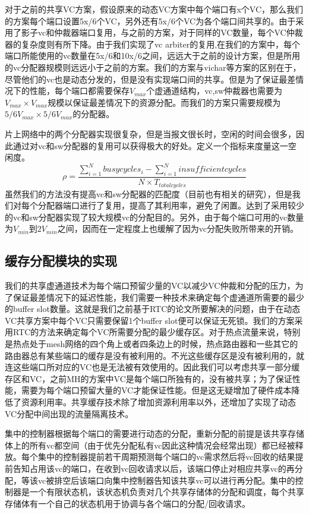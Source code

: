 ﻿\documentclass[10pt,journal]{IEEEtran}
\begin{document}
对于之前的共享VC方案，假设原来的动态VC方案中每个端口有x个VC，那么我们的方案每个端口设置5x/6个VC，另外还有5x/6个VC为各个端口间共享的。由于采用了影子vc和仲裁器端口复用，与之前的方案，对于同样的VC数量，每个VC仲裁器的复杂度则有所下降。由于我们实现了vc arbiter的复用,在我们的方案中，每个端口所能使用的vc数量在5x/6和10x/6之间，远远大于之前的设计方案，但是所用的vc分配器规模则远远小于之前的方案。我们的方案与vichar等方案的区别在于，尽管他们的vc也是动态分发的，但是没有实现端口间的共享。但是为了保证最差情况下的性能，每个端口都需要保存$V_{max}$个虚通道结构，vc,sw仲裁器也需要为$V_{max} \times V_{max}$规模以保证最差情况下的资源分配。而我们的方案只需要规模为$5/6V_{max}\times 5/6V_{max}$的分配器。

片上网络中的两个分配器实现很复杂，但是当报文很长时，空闲的时间会很多，因此通过对vc和sw分配器的复用可以获得极大的好处。定义一个指标来度量这一空闲度。$$\rho=\frac{\sum_{i=1}^N busycycles_i-\sum_{i=1}^Ninsufficientcycles}{N\times T_{totalcycles}}$$虽然我们的方法没有提高vc和sw分配器的匹配度（目前也有相关的研究），但是我们对每个分配器端口进行了复用，提高了其利用率，避免了闲置。达到了采用较少的vc和sw分配器实现了较大规模vc的分配目的。另外，由于每个端口可用的vc数量为$V_{min}$到$2V_{min}$之间，因而在一定程度上也缓解了因为vc分配失败所带来的开销。

\subsection{缓存分配模块的实现}
我们的共享虚通道技术为每个端口预留少量的VC以减少VC仲裁和分配的压力，为了保证最差情况下的延迟性能，我们需要一种技术来确定每个虚通道所需要的最少的buffer slot数量。这就是我们之前基于RTC的论文所要解决的问题，由于在动态VC共享方案中每个VC只需要保留1个buffer slot便可以保证无死锁。我们的方案采用RTC的方法来确定每个VC所需要分配的最少缓存区。对于热点流量来说，特别是热点处于mesh网络的四个角上或者四条边上的时候，热点路由器和一些其它的路由器总有某些端口的缓存是没有被利用的。不光这些缓存区是没有被利用的，就连这些端口所对应的VC也是无法被有效使用的。因此我们可以考虑共享一部分缓存区和VC，之前MH的方案中VC是每个端口所独有的，没有被共享；为了保证性能，需要为每个端口预留大量的VC才能保证性能。但是这无疑增加了硬件成本降低了资源利用率。共享缓存技术除了增加资源利用率以外，还增加了实现了动态VC分配中间出现的流量隔离技术。

集中的控制器根据每个端口的需要进行动态的分配，重新分配的前提是该共享存储体上的所有vc都空间（由于优先分配私有vc因此这种情况会经常出现）都已经被释放。每个集中的控制器提前若干周期预测每个端口的vc需求然后将vc回收的结果提前告知占用该vc的端口，在收到vc回收请求以后，该端口停止对相应共享vc的再分配，等该vc被排空后该端口向集中控制器告知该共享vc可以进行再分配。集中的控制器是一个有限状态机，该状态机负责对几个共享存储体的分配和调度，每个共享存储体有一个自己的状态机用于协调与各个端口的分配/回收请求。
\end{document}
